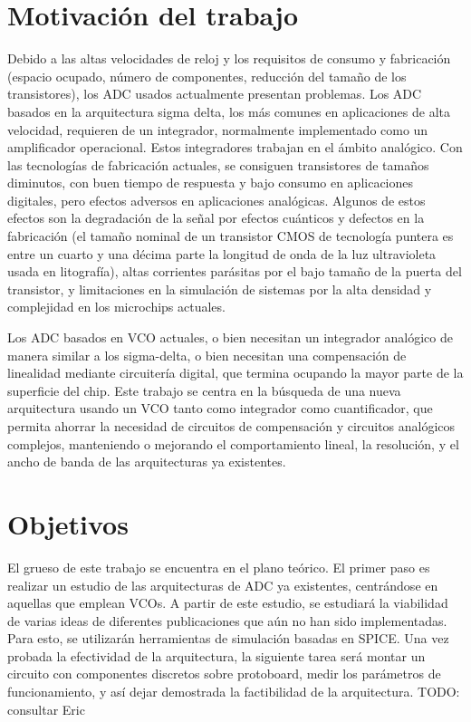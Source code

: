 \documentclass[12pt]{report} %
\begin{document}
	\section{Motivación del trabajo}
	
	Debido a las altas velocidades de reloj y los requisitos de consumo y fabricación (espacio ocupado, número de componentes, reducción del tamaño de los transistores), los ADC usados actualmente presentan problemas. Los ADC basados en la arquitectura sigma delta, los más comunes en aplicaciones de alta velocidad, requieren de un integrador, normalmente implementado como un amplificador operacional. Estos integradores trabajan en el ámbito analógico. Con las tecnologías de fabricación actuales, se consiguen transistores de tamaños diminutos, con buen tiempo de respuesta y bajo consumo en aplicaciones digitales, pero efectos adversos en aplicaciones analógicas. Algunos de estos efectos son la degradación de la señal por efectos cuánticos y defectos en la fabricación (el tamaño nominal de un transistor CMOS de tecnología puntera es entre un cuarto y una décima parte la longitud de onda de la luz ultravioleta usada en litografía), altas corrientes parásitas por el bajo tamaño de la puerta del transistor, y limitaciones en la simulación de sistemas por la alta densidad y complejidad en los microchips actuales.
	
	Los ADC basados en VCO actuales, o bien necesitan un integrador analógico de manera similar a los sigma-delta, o bien necesitan una compensación de linealidad mediante circuitería digital, que termina ocupando la mayor parte de la superficie del chip. Este trabajo se centra en la búsqueda de una nueva arquitectura usando un VCO tanto como integrador como cuantificador, que permita ahorrar la necesidad de circuitos de compensación y circuitos analógicos complejos, manteniendo o mejorando el comportamiento lineal, la resolución, y el ancho de banda de las arquitecturas ya existentes.
	
	\section{Objetivos}
	
	El grueso de este trabajo se encuentra en el plano teórico. El primer paso es realizar un estudio de las arquitecturas de ADC ya existentes, centrándose en aquellas que emplean VCOs. A partir de este estudio, se estudiará la viabilidad de varias ideas de diferentes publicaciones que aún no han sido implementadas. Para esto, se utilizarán herramientas de simulación basadas en SPICE. Una vez probada la efectividad de la arquitectura, la siguiente tarea será montar un circuito con componentes discretos sobre protoboard, medir los parámetros de funcionamiento, y así dejar demostrada la factibilidad de la arquitectura.
	TODO: consultar Eric
\end{document}
